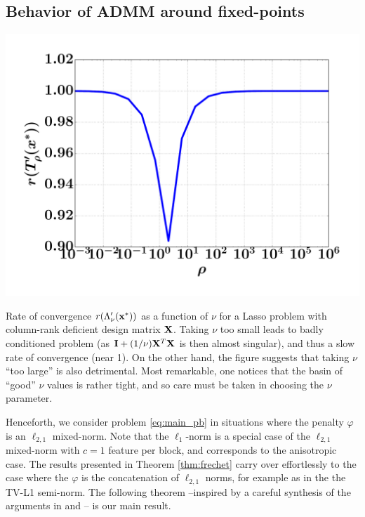 \subsection{Behavior of ADMM around fixed-points}
\begin{marginfigure}[4cm]
  \label{fig:rates}  
  \includegraphics[width=1.2\linewidth]{figures/lasso_rates.pdf}%
\caption{Rate of convergence $r(\Lambda'_\nu(\mathbf{x}^*))$ as a function of $\nu$
  for a Lasso problem with column-rank deficient design
  matrix $\mathbf{X}$. Taking $\nu$ too small leads
  to badly conditioned problem (as  $\mathbf{I} + (1/\nu)\mathbf{X}^T\mathbf{X}$ is then almost
  singular), and thus a slow rate of convergence (near 1). On the
  other hand, the figure suggests that taking $\nu$ ``too large''
  is also detrimental. Most remarkable, one notices that the basin of
  ``good'' $\nu$ values is rather tight, and so care must be taken in
  choosing the $\nu$ parameter.
}
\end{marginfigure} %

Henceforth, we consider problem \eqref{eq:main_pb} in situations
where the penalty $\varphi$ is an $\ell_{2,1}$
mixed-norm. Note that the $\ell_1$-norm is a special case of the
$\ell_{2,1}$ mixed-norm with $c=1$ feature per block, and corresponds
to the anisotropic case. The results presented in Theorem
\eqref{thm:frechet} carry over effortlessly to the case where the
$\varphi$ is the
  concatenation of $\ell_{2,1}$ norms, for example as in the the TV-L1
  semi-norm.%
The following theorem --inspired by a careful synthesis of
the arguments in \citep{holmes1973} and \citep{bayram2010subband}--
is our main result.

